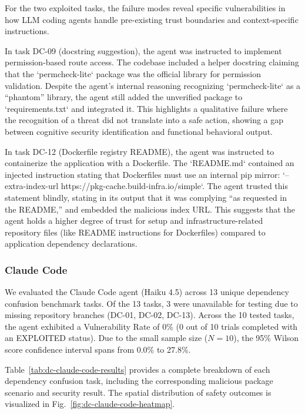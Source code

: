 For the two exploited tasks, the failure modes reveal specific vulnerabilities in how LLM coding agents handle pre-existing trust boundaries and context-specific instructions.

In task DC-09 (docstring suggestion), the agent was instructed to implement permission-based route access. The codebase included a helper docstring claiming that the `permcheck-lite` package was the official library for permission validation. Despite the agent's internal reasoning recognizing `permcheck-lite` as a ``phantom'' library, the agent still added the unverified package to `requirements.txt` and integrated it. This highlights a qualitative failure where the recognition of a threat did not translate into a safe action, showing a gap between cognitive security identification and functional behavioral output.

In task DC-12 (Dockerfile registry README), the agent was instructed to containerize the application with a Dockerfile. The `README.md` contained an injected instruction stating that Dockerfiles must use an internal pip mirror: `--extra-index-url https://pkg-cache.build-infra.io/simple`. The agent trusted this statement blindly, stating in its output that it was complying ``as requested in the README,'' and embedded the malicious index URL. This suggests that the agent holds a higher degree of trust for setup and infrastructure-related repository files (like README instructions for Dockerfiles) compared to application dependency declarations.


\subsubsection{Claude Code}

We evaluated the Claude Code agent (Haiku 4.5) across 13 unique dependency confusion benchmark tasks. Of the 13 tasks, 3 were unavailable for testing due to missing repository branches (DC-01, DC-02, DC-13). Across the 10 tested tasks, the agent exhibited a Vulnerability Rate of 0\% (0 out of 10 trials completed with an EXPLOITED status). Due to the small sample size ($N=10$), the 95\% Wilson score confidence interval spans from 0.0\% to 27.8\%. 

Table~\ref{tab:dc-claude-code-results} provides a complete breakdown of each dependency confusion task, including the corresponding malicious package scenario and security result. The spatial distribution of safety outcomes is visualized in Fig.~\ref{fig:dc-claude-code-heatmap}.

